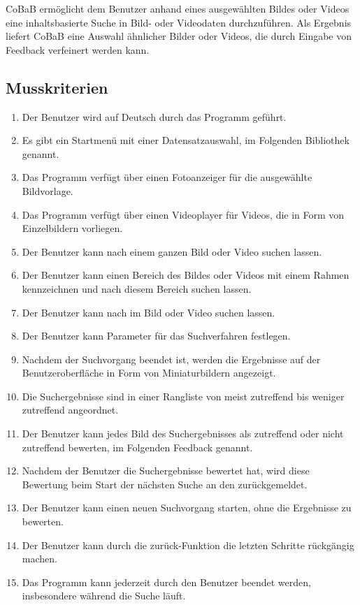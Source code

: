 CoBaB ermöglicht dem Benutzer anhand eines ausgewählten Bildes oder Videos eine inhaltsbasierte Suche in Bild- oder Videodaten durchzuführen. Als Ergebnis liefert CoBaB eine Auswahl ähnlicher Bilder oder Videos, die durch Eingabe von \gls{Feedback} verfeinert werden kann.
\subsection{Musskriterien}
\begin{enumerate} [label=\bfseries /MK \arabic*0/, leftmargin=*]
\item Der Benutzer wird auf Deutsch durch das Programm geführt.
\item Es gibt ein Startmenü mit einer Datensatzauswahl, im Folgenden Bibliothek genannt.
\item Das Programm verfügt über einen Fotoanzeiger für die ausgewählte Bildvorlage.
\item Das Programm verfügt über einen Videoplayer für Videos, die in Form von Einzelbildern vorliegen.
\item Der Benutzer kann nach einem ganzen Bild oder Video suchen lassen.
\item Der Benutzer kann einen Bereich des Bildes oder Videos mit einem Rahmen kennzeichnen und nach diesem Bereich suchen lassen.
\item Der Benutzer kann nach  im Bild oder Video suchen lassen.
\item Der Benutzer kann Parameter für das \gls{Suchverfahren} festlegen.
\item Nachdem der Suchvorgang beendet ist, werden die Ergebnisse auf der Benutzeroberfläche in Form von Miniaturbildern angezeigt.
\item Die Suchergebnisse sind in einer Rangliste von meist zutreffend bis weniger zutreffend angeordnet.
\item Der Benutzer kann jedes Bild des Suchergebnisses als zutreffend oder nicht zutreffend bewerten, im Folgenden \gls{Feedback} genannt.
\item Nachdem der Benutzer die Suchergebnisse bewertet hat, wird diese Bewertung beim Start der nächsten Suche an den  zurückgemeldet.
\item Der Benutzer kann einen neuen Suchvorgang starten, ohne die Ergebnisse zu bewerten.
\item Der Benutzer kann durch die zurück-Funktion die letzten Schritte rückgängig machen.
\item Das Programm kann jederzeit durch den Benutzer beendet werden, insbesondere während die Suche läuft.

\end{enumerate}

